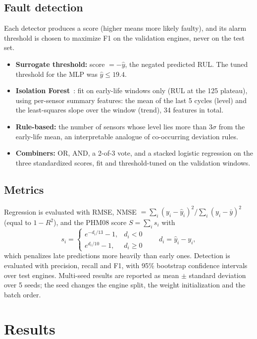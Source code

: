 \documentclass[11pt,a4paper]{article}
\begin{document}
\subsection{Fault detection}
Each detector produces a score (higher means more likely faulty), and its alarm
threshold is chosen to maximize F1 on the validation engines, never on the test
set.
\begin{itemize}
  \item \textbf{Surrogate threshold:} score $= -\hat{y}$, the negated predicted
        RUL. The tuned threshold for the MLP was $\hat{y} \le 19.4$.
  \item \textbf{Isolation Forest}~\cite{liu2008}: fit on early-life windows
        only (RUL at the 125 plateau), using per-sensor summary features: the
        mean of the last 5 cycles (level) and the least-squares slope over the
        window (trend), 34 features in total.
  \item \textbf{Rule-based:} the number of sensors whose level lies more than
        $3\sigma$ from the early-life mean, an interpretable analogue of
        co-occurring deviation rules.
  \item \textbf{Combiners:} OR, AND, a 2-of-3 vote, and a stacked logistic
        regression on the three standardized scores, fit and threshold-tuned
        on the validation windows.
\end{itemize}

\subsection{Metrics}
Regression is evaluated with RMSE, NMSE $= \sum_i (y_i - \hat{y}_i)^2 / \sum_i
(y_i - \bar{y})^2$ (equal to $1 - R^2$), and the PHM08 score
$S = \sum_i s_i$ with
\[
  s_i =
  \begin{cases}
    e^{-d_i/13} - 1, & d_i < 0 \\
    e^{d_i/10} - 1,  & d_i \ge 0
  \end{cases}
  \qquad d_i = \hat{y}_i - y_i,
\]
which penalizes late predictions more heavily than early ones. Detection is
evaluated with precision, recall and F1, with 95\% bootstrap confidence
intervals over test engines. Multi-seed results are reported as mean $\pm$
standard deviation over 5 seeds; the seed changes the engine split, the weight
initialization and the batch order.

\section{Results}
\end{document}
